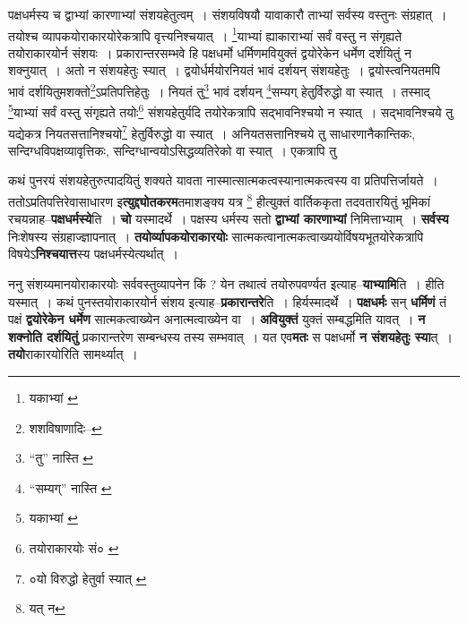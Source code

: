 \documentclass[article,12pt,a4paper]{memoir}
\begin{document}
	  \pstart पक्षधर्मस्य च द्वाभ्यां कारणाभ्यां संशयहेतुत्वम् । संशयविषयौ यावाकारौ ताभ्यां सर्वस्य वस्तुनः संग्रहात् । तयोश्च व्यापकयोराकारयोरेकत्रापि वृत्त्यनिश्चयात् । \footnote{यकाभ्यां \cite{dp-msA} \cite{dp-msB} \cite{dp-msC} \cite{dp-msD} \cite{dp-edP} \cite{dp-edH} \cite{dp-edN}}याभ्यां ह्याकाराभ्यां सर्वं वस्तु न संगृह्यते तयोराकारयोर्न संशयः । प्रकारान्तरसम्भवे हि पक्षधर्मो धर्मिणमवियुक्तं द्वयोरेकेन धर्मेण दर्शयितुं न शक्नुयात् । अतो न संशयहेतुः स्यात् । द्वयोर्धर्मयोरनियतं भावं दर्शयन् संशयहेतुः । द्वयोस्त्वनियतमपि भावं दर्शयितुमशक्तो\footnote{शशविषाणादिः--\cite{dp-msD-n}}ऽप्रतिपत्तिहेतुः । नियतं तु\footnote{“तु” नास्ति \cite{dp-msA} \cite{dp-msB} \cite{dp-edP} \cite{dp-edH} \cite{dp-edE} \cite{dp-edN}} भावं दर्शयन् \footnote{“सम्यग्” नास्ति \cite{dp-msA} \cite{dp-msB} \cite{dp-edP} \cite{dp-edH} \cite{dp-edE} \cite{dp-edN}}सम्यग् हेतुर्विरुद्धो वा स्यात् । तस्माद् \footnote{यकाभ्यां \cite{dp-msB} \cite{dp-msC} \cite{dp-msD} \cite{dp-edP} \cite{dp-edH} \cite{dp-edN}}याभ्यां सर्वं वस्तु संगृह्यते तयोः\footnote{तयोराकारयोः सं० \cite{dp-msC}} संशयहेतुर्यदि तयोरेकत्रापि सद्भावनिश्चयो न स्यात् । सद्भावनिश्चये तु यद्येकत्र नियतसत्तानिश्चयो\footnote{०यो विरुद्धो हेतुर्वा स्यात् \cite{dp-msA} \cite{dp-msB} \cite{dp-msD} \cite{dp-edP} \cite{dp-edH} \cite{dp-edE} \cite{dp-edN}} हेतुर्विरुद्धो वा स्यात् । अनियतसत्तानिश्चये तु साधारणानैकान्तिकः, सन्दिग्धविपक्षव्यावृत्तिकः, सन्दिग्धान्वयोऽसिद्धव्यतिरेको वा स्यात् । एकत्रापि तु
	\pend
      
	  \endgroup
	

	  \pstart कथं पुनरयं संशयहेतुरुत्पादयितुं शक्यते यावता नास्मात्सात्मकत्वस्यानात्मकत्वस्य वा प्रतिपत्तिर्जायते । ततोऽप्रतिपत्तिरेवासाधारण इ\textbf{त्युद्द्योतकरम}तमाशङ्क्य यत्र \footnote{यत् न} हीत्युक्तं वार्तिककृता तदवतारयितुं भूमिकां रचयन्नाह--\textbf{पक्षधर्मस्ये}ति । \textbf{चो} यस्मादर्थे । पक्षस्य धर्मस्य सतो \textbf{द्वाभ्यां कारणाभ्यां} निमित्ताभ्याम् । \textbf{सर्वस्य} निःशेषस्य संग्रहाज्ज्ञापनात् । \textbf{तयोर्व्यापकयोराकारयोः} सात्मकत्वानात्मकत्वाख्ययोर्विषयभूतयोरेकत्रापि विषयेऽ\textbf{निश्चयात्त}स्य पक्षधर्मस्येत्यर्थात् ।
	\pend
      

	  \pstart ननु संशय्यमानयोराकारयोः सर्ववस्तुव्यापनेन किं ? येन तथात्वं तयोरुपवर्ण्यत इत्याह--\textbf{याभ्यामि}ति । हीति यस्मात् । कथं पुनस्तयोराकारयोर्न संशय इत्याह--\textbf{प्रकारान्तरे}ति । हिर्यस्मादर्थे । \textbf{पक्षधर्मः} सन् \textbf{धर्मिणं} तं पक्षं \textbf{द्वयोरेकेन धर्मेण} सात्मकत्वाख्येन अनात्मत्वाख्येन वा । \textbf{अवियुक्तं} युक्तं सम्बद्धमिति यावत् । \textbf{न शक्नोति दर्शयितुं} प्रकारान्तरेण सम्बन्धस्य तस्य सम्भवात् । यत एव\textbf{मतः} स पक्षधर्मो \textbf{न संशयहेतुः स्या}त् । \textbf{तयो}राकारयोरिति सामर्थ्यात् ।
	\pend
      
\end{document}
